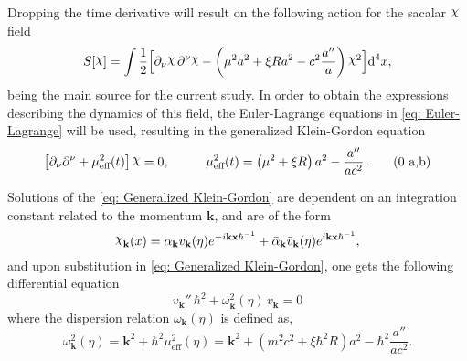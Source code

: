 Dropping the time derivative will result on the following action for the sacalar $\rchi$ field
\begin{equation}
	S[\rchi]=\int\frac{1}{2}\Big[\partial_\nu\rchi\,\partial^\nu\rchi-\left(\mu^2a^2+\xi R a^2-c^2\frac{a''}{a}\right)\rchi^2\Big]\td^4 x,
\end{equation}
being the main source for the current study. In order to obtain the expressions describing the dynamics of this field, the Euler-Lagrange equations in \cref{eq: Euler-Lagrange} will be used, resulting in the generalized Klein-Gordon equation
\begin{subequations}\label{eq: Generalized Klein-Gordon}
	\begin{gather}
		\left[\partial_\nu\partial^\nu+\mu_{\text{eff}}^2(t)\right]\rchi=0,\hspace{1.0cm}\mu_{\text{eff}}^2(t)=\left(\mu^2+\xi R\right)a^2-\frac{a''}{ac^2}.\tag{\theequation \,\,a,b}
	\end{gather}
\end{subequations}

Solutions of the \cref{eq: Generalized Klein-Gordon} are dependent on an integration constant related to the momentum $\mathbf{k}$, and are of the form
\begin{equation}
	\rchi_{\mathbf{k}}(x)=\alpha_\mathbf{k}v_\mathbf{k}(\eta)e^{ -i\mathbf{kx}\hbar^{-1}}+\bar\alpha_\mathbf{k}\bar v_\mathbf{k}(\eta)e^{ i\mathbf{kx}\hbar^{-1}},
\end{equation}
and upon substitution in \eqref{eq: Generalized Klein-Gordon}, one gets the following differential equation
\begin{equation}\label{eq: Expanding diff v}
	v_\mathbf{k}''\,\hbar^2+\omega^2_\mathbf{k}(\eta)\,v_\mathbf{k}=0
\end{equation}
where the dispersion relation $\omega_\mathbf{k}(\eta)$ is defined as,
\begin{equation}\label{eq: Expanding dispersion relation}
	\omega^2_{\mathbf k}(\eta)=\mathbf{k}^2+\hbar^2\mu_{\text{eff}}^2(\eta)=\mathbf{k}^2+\left(m^2c^2+\xi\hbar^2 R\right)a^2-\hbar^2\frac{a''}{ac^2}.
\end{equation}

